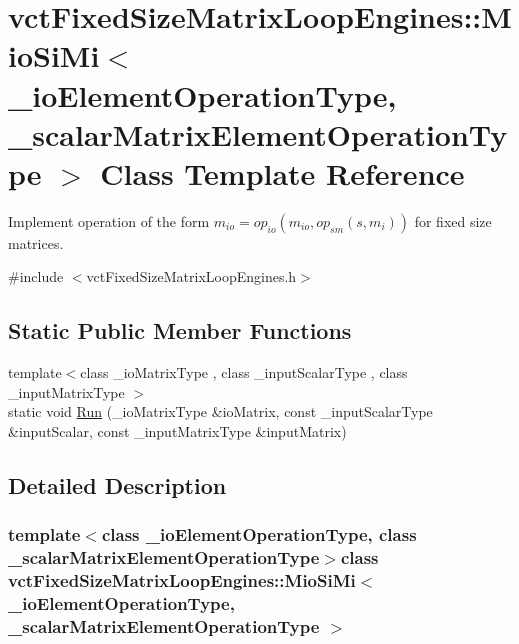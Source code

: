 \hypertarget{classvct_fixed_size_matrix_loop_engines_1_1_mio_si_mi}{\section{vct\-Fixed\-Size\-Matrix\-Loop\-Engines\-:\-:Mio\-Si\-Mi$<$ \-\_\-io\-Element\-Operation\-Type, \-\_\-scalar\-Matrix\-Element\-Operation\-Type $>$ Class Template Reference}
\label{classvct_fixed_size_matrix_loop_engines_1_1_mio_si_mi}
}


Implement operation of the form $m_{io} = op_{io}(m_{io}, op_{sm}(s, m_i))$ for fixed size matrices.  




{\ttfamily \#include $<$vct\-Fixed\-Size\-Matrix\-Loop\-Engines.\-h$>$}

\subsection*{Static Public Member Functions}
\begin{DoxyCompactItemize}
\item 
{\footnotesize template$<$class \-\_\-io\-Matrix\-Type , class \-\_\-input\-Scalar\-Type , class \-\_\-input\-Matrix\-Type $>$ }\\static void \hyperlink{classvct_fixed_size_matrix_loop_engines_1_1_mio_si_mi_af0ffd7f21d1e5b73ff12d8759e1c1c4f}{Run} (\-\_\-io\-Matrix\-Type \&io\-Matrix, const \-\_\-input\-Scalar\-Type \&input\-Scalar, const \-\_\-input\-Matrix\-Type \&input\-Matrix)
\end{DoxyCompactItemize}


\subsection{Detailed Description}
\subsubsection*{template$<$class \-\_\-io\-Element\-Operation\-Type, class \-\_\-scalar\-Matrix\-Element\-Operation\-Type$>$class vct\-Fixed\-Size\-Matrix\-Loop\-Engines\-::\-Mio\-Si\-Mi$<$ \-\_\-io\-Element\-Operation\-Type, \-\_\-scalar\-Matrix\-Element\-Operation\-Type $>$}

